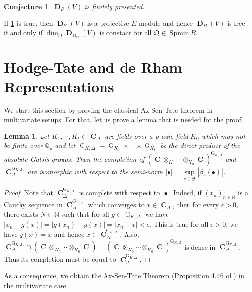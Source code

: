 \documentclass{amsart}
\newtheorem{lemma}[proposition]{Lemma}
\newtheorem{conjecture}[proposition]{Conjecture}
\DeclareMathOperator{\spmin}{Spmin}
\DeclareMathOperator{\C}{\textbf{C}}
\DeclareMathOperator{\G}{G}
\DeclareMathOperator{\bD}{\textbf{D}}
\begin{document}
\begin{conjecture}\label{conj}
    $\bD_B(V)$ is finitely presented.
\end{conjecture}

If \ref{conj} is true, then $\bD_B(V)$ is a projective $E$-module and hence $\bD_B(V)$ is free if and only if $\dim_{\mathfrak{Q}}\bD_{B_\mathfrak{Q}}(V)$ is constant for all $\mathfrak{Q}\in\spmin B$.


\section{Hodge-Tate and de Rham Representations}

We start this section by proving the classical Ax-Sen-Tate theorem in multivariate setups. For that, let us prove a lemma that is needed for the proof.

\begin{lemma}\label{Fixed ring lemma}
    Let $K_1,\cdots,K_t\subset \C_\Delta$ are fields over a p-adic field $K_0$ which may not be finite over $\mathbb{Q}_p$ and let $\G_{K,\Delta}=\G_{K_1}\times\cdots\times\G_{K_t}$ be the direct product of the absolute Galois groups. Then the completion of $(\C\otimes_{K_0}\cdots\otimes_{K_0}\C)^{\G_{K,\Delta}}$ and $\C^{\G_{K,\Delta}}_\Delta$ are isomorphic with respect to the semi-norm $|\bullet|=\sup\limits_{s\in\mathfrak{S}}|\beta_s(\bullet)|$.
\end{lemma}

\begin{proof}
    Note that $\C^{\G_{K,\Delta}}_\Delta$ is complete with respect to $|\bullet|$. Indeed, if $(x_n)_{n\in\mathbb{N}}$ is a Cauchy sequence in $\C^{G_{K,\Delta}}_\Delta$ which converges to $x\in\C_\Delta$, then for every $\epsilon>0$, there exists $N\in\mathbb{N}$ such that for all $g\in\G_{K,\Delta}$ we have $|x_n-g(x)|=|g(x_n)-g(x)|=|x_n-x|<\epsilon$. This is true for all $\epsilon>0$, we have $g(x)=x$ and hence $x\in\C^{\G_{K,\Delta}}_\Delta$. Also, $\C^{\G_{K,\Delta}}_\Delta\cap(\C\otimes_{K_0}\cdots\otimes_{K_0}\C)=(\C\otimes_{K_0}\cdots\otimes_{K_0}\C)^{\G_{K,\Delta}}$ is dense in $\C^{\G_{K,\Delta}}_\Delta$. Thus its completion must be equal to $\C^{\G_{K,\Delta}}_\Delta$.
\end{proof}

As a consequence, we obtain the Ax-Sen-Tate Theorem (Proposition 4.46 of \cite{Fontaine}) in the multivariate case
\end{document}
